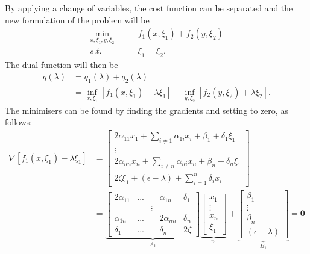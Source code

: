 \documentclass[12pt]{article}
\begin{document}
By applying a change of variables, the cost function can be separated and the new formulation of the problem will be
\begin{align*}
\min_{x,\xi_1,y,\xi_2}\qquad& f_1(x,\xi_1)+f_2(y,\xi_2)\\
s.t.\qquad&\xi_1=\xi_2.
\end{align*}
The dual function will then be
\begin{align*}
q(\lambda)&=q_1(\lambda)+q_2(\lambda)\\
&=\inf_{x,\xi_1}[f_1(x,\xi_1)-\lambda\xi_1]+\inf_{y,\xi_2}[f_2(y,\xi_2)+\lambda\xi_2].
\end{align*}
The minimisers can be found by finding the gradients and setting to zero, as follows:
\begin{align*}
\nabla [f_1(x,\xi_1)-\lambda\xi_1]&=\begin{bmatrix}2\alpha_{11}x_1+\sum\limits_{i\neq1} \alpha_{1i}x_i+\beta_1+\delta_1\xi_1\\ \vdots\\ 2\alpha_{nn}x_n+\sum\limits_{i\neq n} \alpha_{ni}x_n+\beta_n+\delta_n\xi_1\\2\zeta\xi_1+(\epsilon-\lambda)+\sum\limits_{i=1}^n \delta_ix_i\end{bmatrix}\\
&=\underbrace{\begin{bmatrix}2\alpha_{11}&...&&\alpha_{1n}&\delta_1\\&& \vdots\\ \alpha_{1n}&...&&2\alpha_{nn}&\delta_n\\\delta_1&...&&\delta_n&2\zeta\end{bmatrix}}_{A_1} \underbrace{\begin{bmatrix}x_1\\ \vdots\\ x_n\\\xi_1\end{bmatrix}}_{v_1}+\underbrace{\begin{bmatrix}\beta_1\\ \vdots\\ \beta_n\\(\epsilon-\lambda)\end{bmatrix}}_{B_1}=\textbf{0}
\end{align*}
\end{document}
